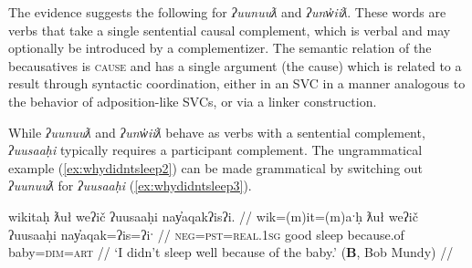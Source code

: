 The evidence suggests the following for \textit{ʔuunuuƛ} and \textit{ʔunw̓iiƛ}. These words are verbs that take a single sentential causal complement, which is verbal and may optionally be introduced by a complementizer. The semantic relation of the becausatives is \textsc{cause} and has a single argument (the cause) which is related to a result through syntactic coordination, either in an SVC in a manner analogous to the behavior of adposition-like SVCs, or via a linker construction.


While \textit{ʔuunuuƛ} and \textit{ʔunw̓iiƛ} behave as verbs with a sentential complement, \textit{ʔuusaaḥi} typically requires a participant complement. The ungrammatical example (\ref{ex:whydidntsleep2}) can be made grammatical by switching out \textit{ʔuunuuƛ} for \textit{ʔuusaaḥi} (\ref{ex:whydidntsleep3}).

\ex \label{ex:whydidntsleep3}
\begingl
\glpreamble wikitaḥ ƛuł weʔič ʔuusaaḥi nay̓aqakʔisʔi. //
\gla wik=(m)it=(m)aˑḥ ƛuł weʔič ʔuusaaḥi nay̓aqak=ʔis=ʔiˑ //
\glb \textsc{neg}=\textsc{pst}=\textsc{real.1sg} good sleep because.of baby=\textsc{dim}=\textsc{art} //
\glft `I didn't sleep well because of the baby.' (\textbf{B}, Bob Mundy) //
\endgl
\xe

\begin{comment}
\ex \label{ex:uusahi1}
\begingl
\glpreamble ʔuusaaḥimta nay̓aqakʔi. wikitaḥ ƛuł weʔič. //
\gla ʔuusaaḥi=imt=(m)aˑ nay̓aqak=ʔiˑ. wik=(m)it=(m)aˑḥ ƛuł weʔič //
\glb because.of=\textsc{pst}=\textsc{real.3} baby=\textsc{art} \textsc{neg}=\textsc{pst}=\textsc{real.1sg} good sleep //
\glft `It was because of the baby; I didn't sleep well.' (\textbf{B}, Bob Mundy) //
\endgl
\xe

\ex~ \label{ex:uusahi2}
\begingl
\glpreamble *ʔuusaaḥimta ʕiḥak nay̓aqakʔi. wikitaḥ ƛuł weʔič. //
\gla ʔuusaaḥi=imt=(m)aˑ ʕiḥak nay̓aqak=ʔiˑ. wik=(m)it=(m)aˑḥ ƛuł weʔič //
\glb because.of=\textsc{pst}=\textsc{real.3} cry.\textsc{dr} baby \textsc{neg}=\textsc{pst}=\textsc{real.1sg} good sleep //
\glft Intended: `It was because of the crying baby; I didn't sleep well.' (\textbf{B}, Bob Mundy) //
\endgl
\xe
\end{comment}

